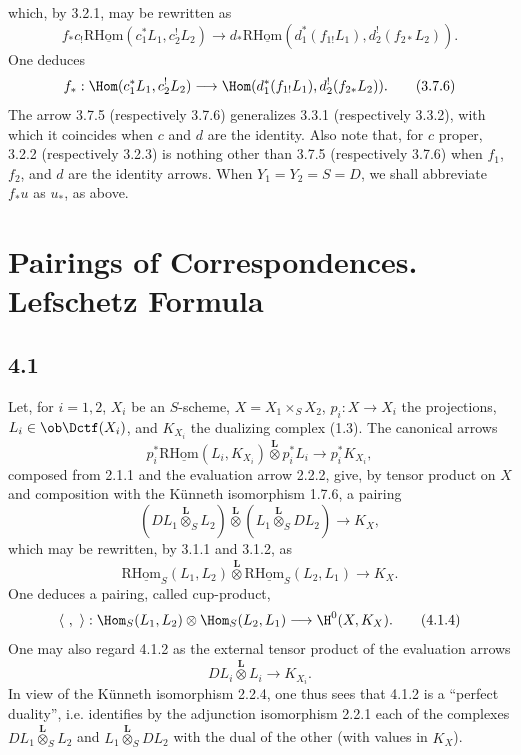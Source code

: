 which, by 3.2.1, may be rewritten as
\begin{equation}
f_*c_!\mathrm{R}\underline{\mathrm{Hom}}(c_1^*L_1,c_2^!L_2)
\longrightarrow
 d_*\mathrm{R}\underline{\mathrm{Hom}}(d_1^*(f_{1!}L_1),d_2^!(f_{2*}L_2)).
\tag{3.7.5}
\end{equation}
One deduces
\begin{equation}
f_*:\Hom(c_1^*L_1,c_2^!L_2)
\longrightarrow
\Hom(d_1^*(f_{1!}L_1),d_2^!(f_{2*}L_2)).
\tag{3.7.6}
\end{equation}
The arrow 3.7.5 (respectively 3.7.6) generalizes 3.3.1 (respectively 3.3.2), with which it coincides when $c$ and $d$ are the identity. Also note that, for $c$ proper, 3.2.2 (respectively 3.2.3) is nothing other than 3.7.5 (respectively 3.7.6) when $f_1$, $f_2$, and $d$ are the identity arrows. When $Y_1=Y_2=S=D$, we shall abbreviate $f_*u$ as $u_*$, as above.

\section{Pairings of Correspondences. Lefschetz Formula}

\subsection*{4.1}
Let, for $i=1,2$, $X_i$ be an $S$-scheme, $X=X_1\times_SX_2$, $p_i:X\to X_i$ the projections, $L_i\in\ob\Dctf(X_i)$, and $K_{X_i}$ the dualizing complex (1.3). The canonical arrows
\begin{equation}
p_i^*\mathrm{R}\underline{\mathrm{Hom}}(L_i,K_{X_i})\overset{\mathbf L}{\otimes}p_i^*L_i
\longrightarrow p_i^*K_{X_i},
\tag{4.1.1}
\end{equation}
composed from 2.1.1 and the evaluation arrow 2.2.2, give, by tensor product on $X$ and composition with the Künneth isomorphism 1.7.6, a pairing
\begin{equation}
(DL_1\overset{\mathbf L}{\otimes}_S L_2)\overset{\mathbf L}{\otimes}(L_1\overset{\mathbf L}{\otimes}_S DL_2)
\longrightarrow K_X,
\tag{4.1.2}
\end{equation}
which may be rewritten, by 3.1.1 and 3.1.2, as
\begin{equation}
\mathrm{R}\underline{\mathrm{Hom}}_S(L_1,L_2)\overset{\mathbf L}{\otimes}\mathrm{R}\underline{\mathrm{Hom}}_S(L_2,L_1)
\longrightarrow K_X.
\tag{4.1.3}
\end{equation}
One deduces a pairing, called cup-product,
\begin{equation}
\langle\ ,\ \rangle:\Hom_S(L_1,L_2)\otimes\Hom_S(L_2,L_1)
\longrightarrow \H^0(X,K_X).
\tag{4.1.4}
\end{equation}
One may also regard 4.1.2 as the external tensor product of the evaluation arrows
\[
DL_i\overset{\mathbf L}{\otimes}L_i\longrightarrow K_{X_i}.
\]
In view of the Künneth isomorphism 2.2.4, one thus sees that 4.1.2 is a ``perfect duality'', i.e. identifies by the adjunction isomorphism 2.2.1 each of the complexes $DL_1\overset{\mathbf L}{\otimes}_S L_2$ and $L_1\overset{\mathbf L}{\otimes}_S DL_2$ with the dual of the other (with values in $K_X$).

